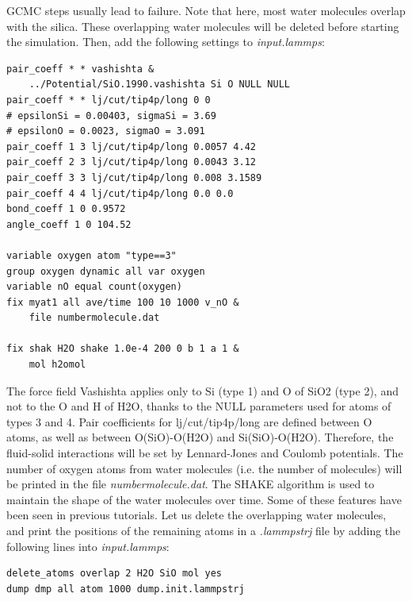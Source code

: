 \documentclass[9pt,tutorial]{livecoms}
\begin{document}
GCMC steps usually lead to failure. Note that here, most water molecules overlap with the silica. These 
overlapping water molecules will be deleted before starting the simulation. Then, add the following settings to \textit{input.lammps}:
{\normalsize \begin{verbatim}
pair_coeff * * vashishta & 
    ../Potential/SiO.1990.vashishta Si O NULL NULL
pair_coeff * * lj/cut/tip4p/long 0 0
# epsilonSi = 0.00403, sigmaSi = 3.69
# epsilonO = 0.0023, sigmaO = 3.091
pair_coeff 1 3 lj/cut/tip4p/long 0.0057 4.42
pair_coeff 2 3 lj/cut/tip4p/long 0.0043 3.12
pair_coeff 3 3 lj/cut/tip4p/long 0.008 3.1589
pair_coeff 4 4 lj/cut/tip4p/long 0.0 0.0
bond_coeff 1 0 0.9572
angle_coeff 1 0 104.52

variable oxygen atom "type==3"
group oxygen dynamic all var oxygen
variable nO equal count(oxygen)
fix myat1 all ave/time 100 10 1000 v_nO &
    file numbermolecule.dat

fix shak H2O shake 1.0e-4 200 0 b 1 a 1 &
    mol h2omol
\end{verbatim}}
The force field Vashishta applies only to Si (type 1) and O of SiO2 (type 2), and not to the O and H of H2O, thanks to the NULL parameters used for atoms of types 3 and 4. Pair coefficients for lj/cut/tip4p/long are defined between O atoms, as well as between O(SiO)-O(H2O) and Si(SiO)-O(H2O). Therefore, the fluid-solid  interactions will be set by Lennard-Jones and Coulomb potentials. The number of oxygen atoms from water molecules (i.e. the number of molecules) will be printed in the file \textit{numbermolecule.dat}. The SHAKE algorithm is used to maintain the shape of the water molecules over time. Some of
these features have been seen in previous tutorials. Let us delete the overlapping water molecules, and print the
positions of the remaining atoms in a \textit{.lammpstrj} file by adding the following lines into \textit{input.lammps}:
{\normalsize \begin{verbatim}
delete_atoms overlap 2 H2O SiO mol yes
dump dmp all atom 1000 dump.init.lammpstrj
\end{verbatim}}
\end{document}
